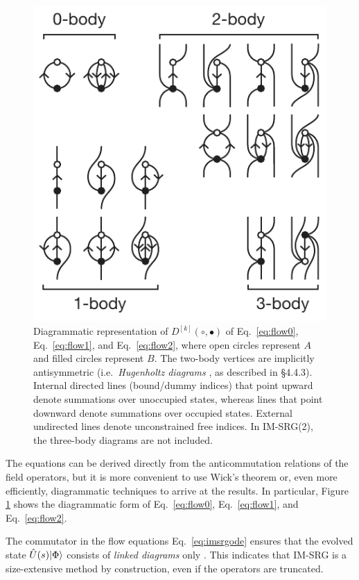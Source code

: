 \begin{figure}
\includegraphics{fig-diagrams-imsrg.pdf}
\caption{Diagrammatic representation of $D^{[k]}(\circ, \bullet)$ of Eq.~\eqref{eq:flow0}, Eq.~\eqref{eq:flow1}, and Eq.~\eqref{eq:flow2}, where open circles represent $A$ and filled circles represent $B$.  The two-body vertices are implicitly antisymmetric (i.e.\ \textit{Hugenholtz diagrams} \cite{HUGENHOLTZ1957481}, as described in \cite{shavitt2009many} \S 4.4.3).  Internal directed lines (bound/dummy indices) that point upward denote summations over unoccupied states, whereas lines that point downward denote summations over occupied states.  External undirected lines denote unconstrained free indices.  In IM-SRG(2), the three-body diagrams are not included.}
\label{fig:diagrams-imsrg}
\end{figure}

The equations can be derived directly from the anticommutation
relations of the field operators, but it is more convenient to use
Wick's theorem \cite{PhysRev.80.268} or, even more efficiently,
diagrammatic techniques \cite{shavitt2009many} to arrive at the
results.  In particular, Figure \ref{fig:diagrams-imsrg} shows the
diagrammatic form of Eq.~\eqref{eq:flow0}, Eq.~\eqref{eq:flow1}, and
Eq.~\eqref{eq:flow2}.

The commutator in the flow equations Eq.~\eqref{eq:imsrgode} ensures
that the evolved state $\hat U(s) | \Phi \rangle$ consists of \emph{linked
diagrams} only \cite{shavitt2009many}.  This indicates that IM-SRG is
a size-extensive \cite{ISI:A1981MN73700014} method by construction,
even if the operators are truncated.

